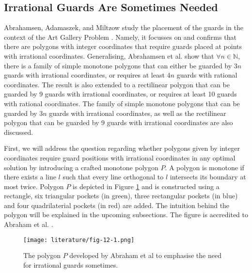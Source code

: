 \subsection{Irrational Guards Are Sometimes Needed}
Abrahamsen, Adamaszek, and Miltzow \cite{abrahamsen2021art} study the placement of the guards in the context of the Art Gallery Problem \cite{o1987art}. Namely, it focusses on and confirms that there are polygons with integer coordinates that require guards placed at points with irrational coordinates. Generalising, Abrahamsen et al. show that $\forall n \in \mathbb N$, there is a family of simple monotone polygons that can either be guarded by $3n$ guards with irrational coordinates, or requires at least $4n$ guards with rational coordinates. The result is also extended to a rectilinear polygon that can be guarded by 9 guards with irrational coordinates, or requires at least 10 guards with rational coordinates. The family of simple monotone polygons that can be guarded by $3n$ guards with irrational coordinates, as well as the rectilinear polygon that can be guarded by 9 guards with irrational coordinates are also discussed.



First, we will address the question regarding whether polygons given by integer coordinates require guard positions with irrational coordinates in any optimal solution by introducing a crafted monotone polygon $P$. A polygon is monotone if there exists a line $l$ such that every line orthogonal to $l$ intersects its boundary at most twice. Polygon $P$ is depicted in Figure \ref{fig:p} and is constructed using a rectangle, six triangular pockets (in green), three rectangular pockets (in blue) and four quadrilaterial pockets (in red) are added. The intuition behind the polygon will be explained in the upcoming subsections. The figure is accredited to Abraham et al. \cite{1057165}.

\begin{figure}[h!]
    \centering
    \texttt{[image: literature/fig-12-1.png]}
    \caption{The polygon $P$ developed by Abraham et al \cite{1057165} to emphasise the need for irrational guards sometimes.}
    \label{fig:p}
\end{figure}


